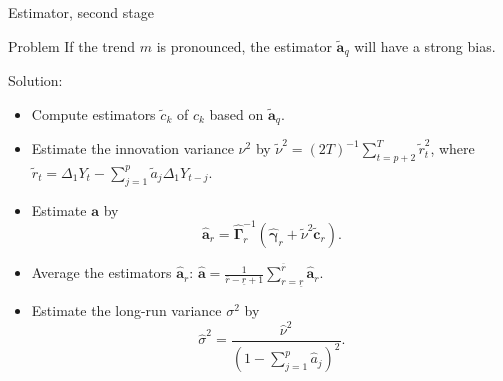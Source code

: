 \documentclass[10pt]{beamer}
\begin{document}
\begin{frame}{Estimator, second stage}
\begin{block}{Problem}
If the trend $m$ is pronounced, the estimator $\widetilde{\boldsymbol{a}}_q$ will have a strong bias.
\end{block}\pause
\vspace{-2mm}
Solution:
\begin{itemize}
	\item \vspace{-2mm} Compute estimators $\widetilde{c}_k$ of $c_k$ based on $\widetilde{\boldsymbol{a}}_q$.\pause
	\item Estimate the innovation variance $\nu^2$ by $\widetilde{\nu}^2 = (2T)^{-1} \sum_{t=p+2}^T \widetilde{r}_{t}^2$, where $\widetilde{r}_{t} = \Delta_1 Y_{t} - \sum_{j=1}^p \widetilde{a}_j \Delta_1 Y_{t-j}$.\pause
	\item Estimate $\boldsymbol{a}$ by 
\begin{equation*}\label{est-AR-SS} 
\widehat{\boldsymbol{a}}_r = \widehat{\boldsymbol{\Gamma}}_r^{-1} (\widehat{\boldsymbol{\gamma}}_r + \widetilde{\nu}^2 \widetilde{\boldsymbol{c}}_r).
\end{equation*}\pause
	\item \vspace{-4mm} Average the estimators $\widehat{\boldsymbol{a}}_r$: $\widehat{\boldsymbol{a}} = \frac{1}{\overline{r} - \underline{r} + 1} \sum\limits_{r=\underline{r}}^{\overline{r}} \widehat{\boldsymbol{a}}_r$.\pause
	\item Estimate the long-run variance $\sigma^2$ by 
\begin{equation*} \label{est-lrv}
\widehat{\sigma}^2 = \frac{\widehat{\nu}^2}{(1 - \sum_{j=1}^p \widehat{a}_j)^2}. 
\end{equation*}
\end{itemize}
\end{frame}
\end{document}
